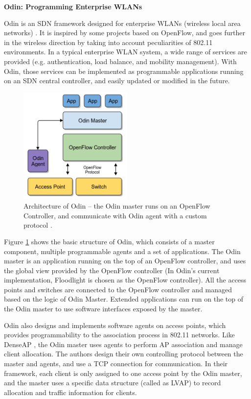 \documentclass[english]{tktltiki}
\begin{document}
\vspace{1mm}

\textbf{Odin: Programming Enterprise WLANs}

\vspace{1mm}

Odin is an SDN framework designed for enterprise WLANs (wireless local area networks) \cite{sszm+12}. It is inspired by some projects based on OpenFlow, and goes further in the wireless direction by taking into account peculiarities of 802.11 environments. In a typical enterprise WLAN system, a wide range of services are provided (e.g. authentication, load balance, and mobility management). With Odin, those services can be implemented as programmable applications running on an SDN central controller, and easily updated or modified in the future. 

\begin{figure}[htbp]
  \centering
  \includegraphics[width=0.5\textwidth]{images/odin.png}
  \caption{Architecture of Odin -- the Odin master runs on an OpenFlow Controller, and communicate with Odin agent with a custom protocol \cite{sszm+12}.}
  \label{fig:odin}
\end{figure}

Figure \ref{fig:odin} shows the basic structure of Odin, which consists of a master component, multiple programmable agents and a set of applications. The Odin master is an application running on the top of an OpenFlow controller, and uses the global view provided by the OpenFlow controller (In Odin's current implementation, Floodlight is chosen as the OpenFlow controller). All the access points and switches are connected to the OpenFlow controller and managed based on the logic of Odin Master. Extended applications can run on the top of the Odin master to use software interfaces exposed by the master. 

Odin also designs and implements software agents on access points, which provides programmability to the association process in 802.11 networks. Like DenseAP \cite{mpc+08}, the Odin master uses agents to perform AP association and manage client allocation. The authors design their own controlling protocol between the master and agents, and use a TCP connection for communication. In their framework, each client is only assigned to one access point by the Odin master, and the master uses a specific data structure (called as LVAP) to record allocation and traffic information for clients.
\end{document}
